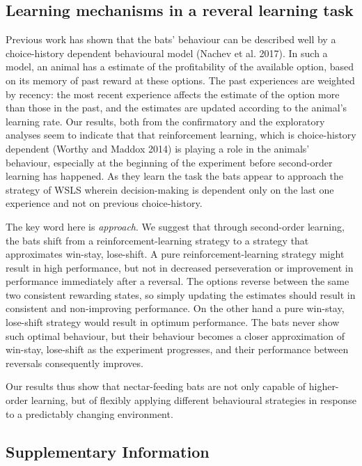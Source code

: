 \documentclass[
]{article}
\begin{document}
\hypertarget{learning-mechanisms-in-a-reveral-learning-task}{%
\subsection{Learning mechanisms in a reveral learning task}\label{learning-mechanisms-in-a-reveral-learning-task}}

Previous work has shown that the bats' behaviour can be described well by a choice-history dependent behavioural model (Nachev et al. 2017). In such a model, an animal has a estimate of the profitability of the available option, based on its memory of past reward at these options. The past experiences are weighted by recency: the most recent experience affects the estimate of the option more than those in the past, and the estimates are updated according to the animal's learning rate. Our results, both from the confirmatory and the exploratory analyses seem to indicate that that reinforcement learning, which is choice-history dependent (Worthy and Maddox 2014) is playing a role in the animals' behaviour, especially at the beginning of the experiment before second-order learning has happened. As they learn the task the bats appear to approach the strategy of WSLS wherein decision-making is dependent only on the last one experience and not on previous choice-history.

The key word here is \emph{approach}. We suggest that through second-order learning, the bats shift from a reinforcement-learning strategy to a strategy that approximates win-stay, lose-shift. A pure reinforcement-learning strategy might result in high performance, but not in decreased perseveration or improvement in performance immediately after a reversal. The options reverse between the same two consistent rewarding states, so simply updating the estimates should result in consistent and non-improving performance. On the other hand a pure win-stay, lose-shift strategy would result in optimum performance. The bats never show such optimal behaviour, but their behaviour becomes a closer approximation of win-stay, lose-shift as the experiment progresses, and their performance between reversals consequently improves.

Our results thus show that nectar-feeding bats are not only capable of higher-order learning, but of flexibly applying different behavioural strategies in response to a predictably changing environment.

\hypertarget{supplementary-information}{%
\subsection{Supplementary Information}\label{supplementary-information}}
\end{document}

